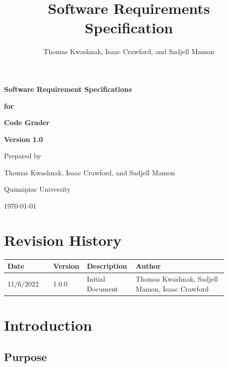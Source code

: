 \documentclass{article}
\title{Software Requirements Specification}
\author{Thomas Kwashnak, Isaac Crawford, and Sadjell Mamon}
\begin{document}

\begin{titlepage}
  \vspace*{1cm}

  \Huge
  \textbf{Software Requirement Specifications}

  \vspace{0.5cm}

  \textbf{for}

  \vspace{0.5cm}

  \textbf{Code Grader}

  \vspace{2cm}

  \LARGE
  \textbf{Version 1.0}

  \vspace{3cm}

  Prepared by

  Thomas Kwashnak, Isaac Crawford, and Sadjell Mamon

  \vspace{0.75cm}
  Quinnipiac University

  \vspace{7cm}

  \today
\end{titlepage}

\section*{Revision History}

\begin{tabular}{| p{0.2\linewidth} | p{0.075\linewidth} | p{0.2\linewidth} | p{0.4\linewidth} |}
  \hline
  Date & Version & Description & Author\\
  \hline
  \hline
  11/6/2022 & 1.0.0 & Initial Document & Thomas Kwashnak, Sadjell Mamon, Isaac Crawford \\
  \hline

\end{tabular}

\newpage

\tableofcontents

\newpage

\section{Introduction}

\subsection{Purpose}
\end{document}
